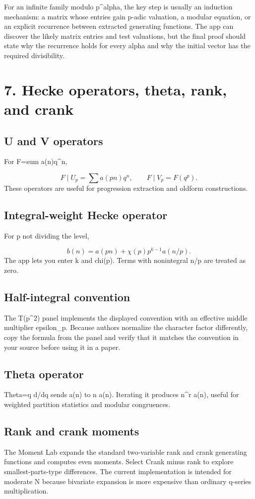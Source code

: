 \documentclass[11pt]{article}
\begin{document}
For an infinite family modulo p\textasciicircum{}alpha, the key step is usually an induction mechanism: a matrix whose entries gain p-adic valuation, a modular equation, or an explicit recurrence between extracted generating functions. The app can discover the likely matrix entries and test valuations, but the final proof should state why the recurrence holds for every alpha and why the initial vector has the required divisibility.

\newpage
\section{7. Hecke operators, theta, rank, and crank}
\subsection*{U and V operators}
For F=sum a(n)q\textasciicircum{}n,

\[
F\mid U_p=\sum a(pn)q^n,\qquad F\mid V_p=F(q^p).
\]
These operators are useful for progression extraction and oldform constructions.

\subsection*{Integral-weight Hecke operator}
For p not dividing the level,

\[
b(n)=a(pn)+\chi(p)p^{k-1}a(n/p).
\]
The app lets you enter k and chi(p). Terms with nonintegral n/p are treated as zero.

\subsection*{Half-integral convention}
The T(p\textasciicircum{}2) panel implements the displayed convention with an effective middle multiplier epsilon\_p. Because authors normalize the character factor differently, copy the formula from the panel and verify that it matches the convention in your source before using it in a paper.

\subsection*{Theta operator}
Theta=q d/dq sends a(n) to n a(n). Iterating it produces n\textasciicircum{}r a(n), useful for weighted partition statistics and modular congruences.

\subsection*{Rank and crank moments}
The Moment Lab expands the standard two-variable rank and crank generating functions and computes even moments. Select Crank minus rank to explore smallest-parts-type differences. The current implementation is intended for moderate N because bivariate expansion is more expensive than ordinary q-series multiplication.
\end{document}
